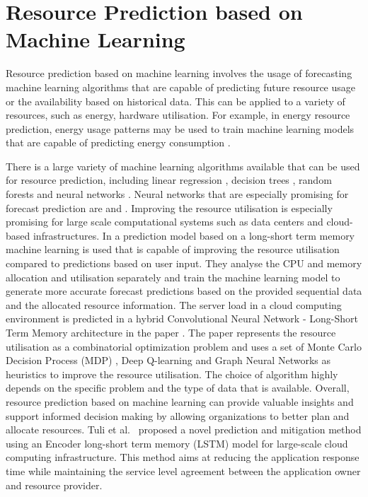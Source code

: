    \section{Resource Prediction based on Machine Learning}
    \label{sec:resource-prediction-based-on-machine-learning-related-work}
    
        Resource prediction based on machine learning involves the usage of forecasting machine learning algorithms that are capable of predicting future resource usage or the availability based on historical data.
        This can be applied to a variety of resources, such as energy, hardware utilisation.
        For example, in energy resource prediction, energy usage patterns may be used to train machine learning models that are capable of predicting energy consumption \cite{shapiEnergyConsumptionPrediction2021} \cite{richDeepMindAIReduces2016}.

        There is a large variety of machine learning algorithms available that can be used for resource prediction, including linear regression \cite{weisbergAppliedLinearRegression2005}, decision trees \cite{kotsiantisDecisionTreesRecent2013}, random forests \cite{breimanRandomForests2001} and neural networks \cite{andersonIntroductionNeuralNetworks1995}.
        Neural networks that are especially promising for forecast prediction are  and .
        Improving the resource utilisation is especially promising for large scale computational systems such as data centers and cloud-based infrastructures. In \cite{thonglekImprovingResourceUtilization2019} a prediction model based on a long-short term memory machine learning is used that is capable of improving the resource utilisation compared to predictions based on user input.
        They analyse the CPU and memory allocation and utilisation separately and train the machine learning model to generate more accurate forecast predictions based on the provided sequential data and the allocated resource information.
        The server load in a cloud computing environment is predicted in a hybrid Convolutional Neural Network - Long-Short Term Memory architecture in the paper \cite{patelHybridCNNLSTMModel2022}.
        The paper \cite{orenSOLOSearchOnline2021} represents the resource utilisation as a combinatorial optimization problem and uses a set of Monte Carlo Decision Process (MDP) \cite{jamesMonteCarloTheory1980}, Deep Q-learning and Graph Neural Networks as heuristics to improve the resource utilisation.
        The choice of algorithm highly depends on the specific problem and the type of data that is available.
        Overall, resource prediction based on machine learning can provide valuable insights and support informed decision making by allowing organizations to better plan and allocate resources.
        Tuli et al.~\cite{tuli2021start} proposed a novel prediction and mitigation method using an Encoder long-short term memory (LSTM) model for large-scale cloud computing infrastructure. This method aims at reducing the application response time while maintaining the service level agreement between the application owner and resource provider.

